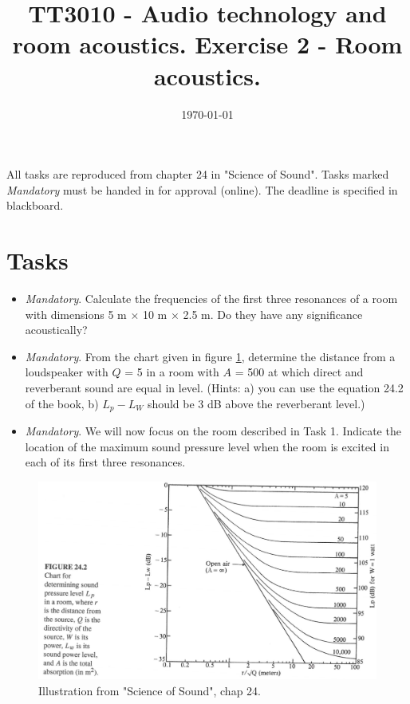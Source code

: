 \documentclass{article}
\title{TT3010 - Audio technology and room acoustics. \newline Exercise 2 - Room acoustics.}
\date{\today}
\begin{document}
\maketitle

All tasks are reproduced from chapter 24 in "Science of Sound". %
Tasks marked \textit{Mandatory} must be handed in for approval (online). The deadline is specified in blackboard. 

\section*{Tasks}
\begin{itemize}
    \item [1.] \textit{Mandatory}. Calculate the frequencies of the first three resonances of a room with dimensions 5 m $\times$ 10 m  $\times$ 2.5 m. Do they have any significance acoustically?
        
    
    \item[2.] \textit{Mandatory}. From the chart given in figure \ref{fig:nc}, determine the distance from a loudspeaker with $Q$ = 5 in a room with $A$ = 500 at which direct and reverberant sound are equal in level. (Hints: a) you can use the equation 24.2 of the book, b) $L_p-L_W$ should be 3 dB above the reverberant level.)
        
    \item[3.] \textit{Mandatory}. We will now focus on the room described in Task 1. Indicate the location of the maximum sound pressure level when the room is excited in each of its first three resonances.
    
    
 
\end{itemize}


\begin{figure}[H]
    \centering
    \includegraphics[scale=0.7]{figures/oving2_1.png}
   \caption{Illustration from "Science of Sound", chap 24.}
    \label{fig:nc}
\end{figure}
\end{document}
